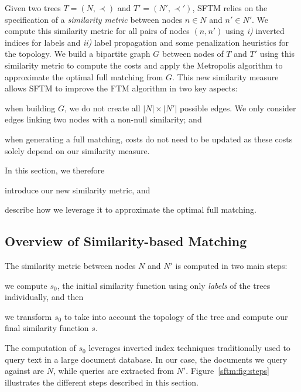 Given two trees $T=(N,\prec)$ and $T'=(N',\prec')$, SFTM relies on the specification of a \textit{similarity metric} between nodes $n \in N$ and $n' \in N'$.
We compute this similarity metric for all pairs of nodes $(n,n')$ using \emph{i)} inverted indices for labels and \emph{ii)} label propagation and some penalization heuristics for the topology.
We build a bipartite graph $G$ between nodes of $T$ and $T'$ using this similarity metric to compute the costs and apply the Metropolis algorithm to approximate the optimal full matching from $G$.
This new similarity measure allows SFTM to improve the FTM algorithm in two key aspects:
\begin{compactenum}
	\item when building $G$, we do not create all $|N|\times|N'|$ possible edges. We only consider edges linking two nodes with a non-null similarity; and
    \item when generating a full matching, costs do not need to be updated as these costs solely depend on our similarity measure.
\end{compactenum}
In this section, we therefore
\begin{inparaenum}[(a)]
	\item introduce our new similarity metric, and
    \item describe how we leverage it to approximate the optimal full matching.
\end{inparaenum}

\subsection{Overview of Similarity-based Matching}\label{se:newCost}
The similarity metric between nodes $N$ and $N'$ is computed in two main steps:
\begin{inparaenum}
	\item we compute $s_0$, the initial similarity function using only \textit{labels} of the trees individually, and then
    \item we transform $s_0$ to take into account the topology of the tree and compute our final similarity function $s$.
\end{inparaenum}
The computation of $s_0$ leverages inverted index techniques traditionally used to query text in a large document database.
In our case, the documents we query against are $N$, while queries are extracted from $N'$.
Figure~\ref{sftm:fig:steps} illustrates the different steps described in this section.

